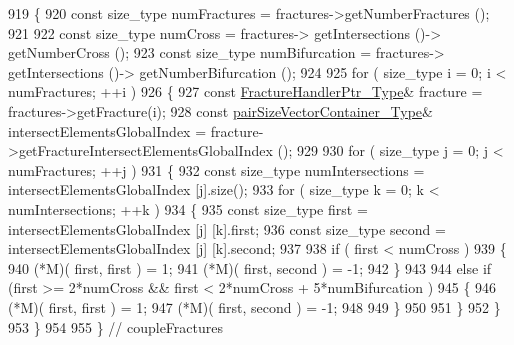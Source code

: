 \begin{DoxyCode}
919 \{
920     \textcolor{keyword}{const} size\_type numFractures = fractures->getNumberFractures ();
921     
922     \textcolor{keyword}{const} size\_type numCross = fractures-> getIntersections ()-> getNumberCross ();
923     \textcolor{keyword}{const} size\_type numBifurcation = fractures-> getIntersections ()-> getNumberBifurcation ();
924 
925     \textcolor{keywordflow}{for} ( size\_type i = 0; i < numFractures; ++i )
926     \{
927         \textcolor{keyword}{const} \hyperlink{FractureHandler_8h_af23fb7a30aaff864bd42587af4f1e78a}{FractureHandlerPtr\_Type}& fracture = fractures->getFracture(i);
928         \textcolor{keyword}{const} \hyperlink{Core_8h_a9bc476e433f99b82a9c2b8560735c7b5}{pairSizeVectorContainer\_Type}& intersectElementsGlobalIndex = 
      fracture->getFractureIntersectElementsGlobalIndex ();
929 
930         \textcolor{keywordflow}{for} ( size\_type j = 0; j < numFractures; ++j )
931         \{
932             \textcolor{keyword}{const} size\_type numIntersections = intersectElementsGlobalIndex [j].size();
933             \textcolor{keywordflow}{for} ( size\_type k = 0; k < numIntersections; ++k )
934             \{
935                 \textcolor{keyword}{const} size\_type first = intersectElementsGlobalIndex [j] [k].first;
936                 \textcolor{keyword}{const} size\_type second = intersectElementsGlobalIndex [j] [k].second;
937                 
938                 \textcolor{keywordflow}{if} ( first < numCross )
939                 \{
940                     (*M)( first, first ) = 1;
941                     (*M)( first, second ) = -1;
942                 \}
943                 
944                 \textcolor{keywordflow}{else} \textcolor{keywordflow}{if} (first >= 2*numCross && first < 2*numCross + 5*numBifurcation )
945                 \{
946                     (*M)( first, first ) = 1;
947                     (*M)( first, second ) = -1;
948                     
949                 \}
950                 
951             \}
952         \}
953     \}
954 
955 \} \textcolor{comment}{// coupleFractures}
\end{DoxyCode}
